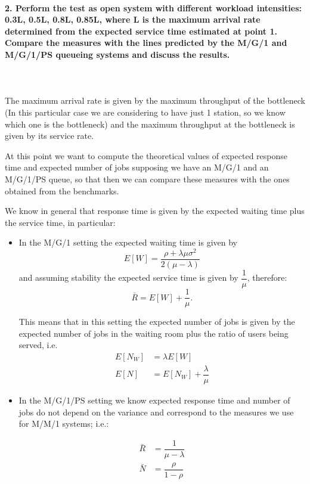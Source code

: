 \documentclass[11pt]{scrartcl} %
\begin{document}
\paragraph*{2. Perform the test as open system with different workload intensities: 0.3L, 0.5L, 0.8L, 0.85L, where L is the maximum arrival rate determined from the expected service time estimated at point 1. Compare the measures with the lines predicted by the M/G/1 and M/G/1/PS queueing systems and discuss the results.} \mbox{}\\\\

The maximum arrival rate is given by the maximum throughput of the bottleneck (In this particular case we are considering to have just 1 station, so we know which one is the bottleneck) and the maximum throughput at the bottleneck is given by its service rate.

At this point we want to compute the theoretical values of expected response time and expected number of jobs supposing we have an M/G/1 and an M/G/1/PS queue, so that then we can compare these measures with the ones obtained from the benchmarks.

We know in general that response time is given by the expected waiting time plus the service time, in particular: 
\begin{itemize}
\item[\adforn{43}] In the M/G/1 setting the expected waiting time is given by $$E[W]=\dfrac{\rho+\lambda\mu\sigma^2}{2(\mu-\lambda)}$$ and assuming stability the expected service time is given by $\dfrac{1}{\mu}$, therefore:
$$\bar{R}=E[W]+\dfrac{1}{\mu} .$$

This means that in this setting the expected number of jobs is given by the expected number of jobs in the waiting room plus the ratio of users being served, i.e.
\begin{align*}
E[N_W] &= \lambda E[W]\\
E[N] &= E[N_W]+\dfrac{\lambda}{\mu}
\end{align*}

\item[\adforn{43}] In the M/G/1/PS setting we know expected response time and number of jobs do not depend on the variance and correspond to the measures we use for M/M/1 systems; i.e.:

\begin{align*}
\bar{R} &= \dfrac{1}{\mu-\lambda}\\
\bar{N} &= \dfrac{\rho}{1-\rho}
\end{align*}
\end{itemize}
\end{document}
